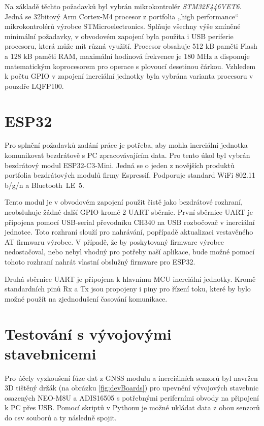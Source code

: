 

Na základě těchto požadavků byl vybrán mikrokontrolér \emph{STM32F446VET6}. Jedná se 32bitový Arm Cortex-M4 procesor z portfolia „high performance“ mikrokontrolérů výrobce STMicroelectronics. Splňuje všechny výše zmíněné minimální požadavky, v obvodovém zapojení byla použita i USB periferie procesoru, která může mít různá využití. Procesor obsahuje 512 kB paměti Flash a 128 kB paměti RAM, maximální hodinová frekvence je 180 MHz a disponuje matematickým koprocesorem pro operace s plovoucí desetinou čárkou. Vzhledem k počtu \ac{GPIO} v zapojení inerciální jednotky byla vybrána varianta procesoru v pouzdře LQFP100. \cite{csdGtKJDMSdbwJ9r}

\section{ESP32}
Pro splnění požadavků zadání práce je potřeba, aby mohla inerciální jednotka komunikovat bezdrátově s PC zpracovávajícím data. Pro tento úkol byl vybrán bezdrátový modul ESP32-C3-Mini. Jedná se o jeden z novějších produktů portfolia bezdrátových modulů firmy Espressif. Podporuje standard WiFi 802.11 b/g/n a Bluetooth~LE~5. \cite{zJ7x5ye8Y5eJn1E2}

Tento modul je v obvodovém zapojení použit čistě jako bezdrátové rozhraní, neobsluhuje žádné další \ac{GPIO} kromě 2 \ac{UART} sběrnic. První sběrnice \ac{UART} je připojena pomocí USB-serial převodníku CH340 na \ac{USB} rozbočovač v inerciální jednotce. Toto rozhraní slouží pro nahrávání, popřípadě aktualizaci vestavěného AT firmwaru výrobce. V případě, že by poskytovaný firmware výrobce nedostačoval, nebo nebyl vhodný pro potřeby naší aplikace, bude možné pomocí tohoto rozhraní nahrát vlastní obslužný firmware pro ESP32.

Druhá sběrnice \ac{UART} je připojena k hlavnímu \ac{MCU} inerciální jednotky. Kromě standardních pinů Rx a Tx jsou propojeny i piny pro řízení toku, které by bylo možné použít na zjednodušení časování komunikace.

\section{Testování s vývojovými stavebnicemi}
Pro účely vyzkoušení fúze dat z \ac{GNSS} modulu a inerciálních senzorů byl navržen 3D tištěný držák (na obrázku \ref{fig:devBoards}) pro upevnění vývojových stavebnic osazených NEO-M8U a ADIS16505 s potřebnými periferními obvody na připojení k PC přes \ac{USB}. Pomocí skriptů v Pythonu je možné ukládat data z obou senzorů do csv souborů a ty následně spojit.

